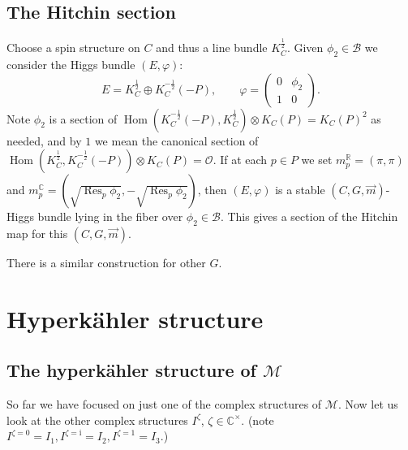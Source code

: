 \documentclass[12pt,letterpaper,reqno]{article}
\numberwithin{equation}{section}
\newcommand{\cB}{\ensuremath{\mathcal B}}
\newcommand{\cM}{\ensuremath{\mathcal M}}
\newcommand{\cO}{\ensuremath{\mathcal O}}
\newcommand{\R}{\ensuremath{\mathbb R}}
\newcommand{\C}{\ensuremath{\mathbb C}}
\newcommand{\half}{\ensuremath{\frac{1}{2}}}
\newcommand{\I}{{\mathrm i}}
\newcommand{\vphi}{{\vec\phi}}
\DeclareMathOperator{\Hom}{Hom}
\DeclareMathOperator{\Res}{Res}
\newcommand{\SU}{\mathrm{SU}}
\newcommand{\fixme}[1]{{\color{orange}{[#1]}}}
\begin{document}
\fixme{write in local coords}

\fixme{remark this is exactly $g$ in abelian case?}


\subsection{The Hitchin section}


\begin{defn}[Hitchin section, for $G = \SU(2)$]
Choose a spin structure on $C$ and thus a line bundle
$K_C^\half$.
Given $\phi_2 \in \cB$ we consider the Higgs bundle
$(E,\varphi)$:
\begin{equation}
  E = K_C^{\half} \oplus K_C^{-\half}(-P), \qquad \varphi = \begin{pmatrix} 0 & \phi_2 \\ 1 & 0 \end{pmatrix}.
\end{equation}
Note $\phi_2$ is a section of $\Hom(K_C^{-\half}(-P), K_C^\half) \otimes K_C(P) = K_C(P)^2$ as needed, and by $1$ we mean the 
canonical section of $\Hom(K_C^\half, K_C^{-\half}(-P)) \otimes K_C(P) = \cO$. If at each $p \in P$ we set
$m^\R_p = (\pi,\pi)$
and $m^\C_p = (\sqrt{\Res_p \phi_2}, -\sqrt{\Res_p \phi_2})$,
then $(E,\varphi)$ is a stable \fixme{check} 
$(C,G,\vec{m})$-Higgs bundle
lying in the fiber over $\phi_2 \in \cB$.
This gives a section of the Hitchin map for this $(C,G,\vec{m})$.
\end{defn}
There is a similar construction for other $G$. \fixme{give refs}



\section{Hyperk\"ahler structure}

\subsection{The hyperk\"ahler structure of $\cM$}

So far we have focused on just one of the complex
structures of $\cM$. Now let us look at the other
complex structures $I^\zeta$, $\zeta \in \C^\times$.
(note $I^{\zeta=0} = I_1, I^{\zeta = \I} = I_2, I^{\zeta = 1} = I_3$.)
\end{document}
